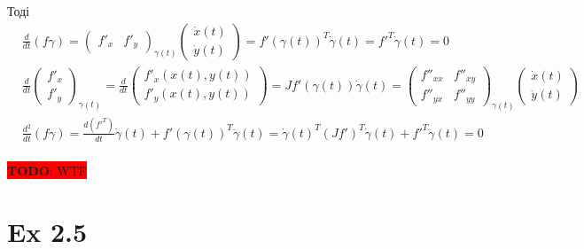 \documentclass[10pt, a4paper]{article} %
\newcommand{\todo}[1]{\colorbox{red}{\textbf{TODO}: #1}}
\begin{document}
Тоді 
\begin{align*}
    &\frac{d}{dt}(f\gamma) = \begin{pmatrix}f'_x & f'_y\end{pmatrix}_{\gamma(t)} \begin{pmatrix}\dot x(t) \\ \dot y(t)\end{pmatrix} = f'(\gamma(t))^T \dot \gamma(t) = f'^T\dot \gamma(t) = 0\\
    &\frac{d}{dt} \begin{pmatrix}f'_x \\ f'_y \end{pmatrix}_{\gamma(t)} = \frac{d}{dt} \begin{pmatrix}
        f'_x(x(t), y(t)) \\ f'_y(x(t), y(t))
    \end{pmatrix} = Jf'(\gamma(t)) \dot \gamma(t) = \begin{pmatrix}
        f''_{xx} & f''_{xy} \\ f''_{yx} & f''_{yy}
    \end{pmatrix}_{\gamma(t)}\begin{pmatrix}
        \dot x(t) \\ \dot y(t)
    \end{pmatrix}\\
    &\frac{d^2}{dt}(f\gamma) = \frac{d(f'^T)}{dt} \dot \gamma(t) + f'(\gamma(t))^T \ddot \gamma(t) = \dot \gamma(t)^T (Jf')^T \dot \gamma(t) + f'^T \ddot \gamma(t) = 0\\
    &
\end{align*}

\todo{WTF}



\section*{Ex 2.5}
\end{document}
